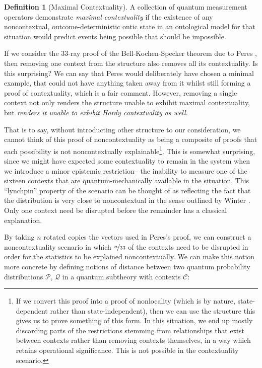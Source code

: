 \documentclass{amsart}
\theoremstyle{definition}
\newtheorem{defn}{Definition}
\begin{document}
\begin{defn}[Maximal Contextuality]
A collection of quantum measurement operators demonstrate \emph{maximal contextuality} if the existence of any noncontextual, outcome-deterministic ontic state in an ontological model for that situation would predict events being possible that should be impossible. %
\end{defn}



If we consider the 33-ray proof of the Bell-Kochen-Specker theorem due to Peres \cite{Pere1991}, then removing one context from the structure also removes all its contextuality. Is this surprising? We can say that Peres would deliberately have chosen a minimal example, that could not have anything taken away from it whilst still forming a proof of contextuality, which is a fair comment. However, removing a single context not only renders the structure unable to exhibit maximal contextuality, but \emph{renders it unable to exhibit Hardy contextuality as well}.

That is to say, without introducting other structure to our consideration, we cannot think of this proof of noncontextuality as being a composite of proofs that each possibility is not noncontextually explainable\footnote{If we convert this proof into a proof of nonlocality (which is by nature, state-dependent rather than state-independent), then we can use the structure this gives us to prove something of this form. In this situation, we end up mostly %
discarding parts of the restrictions stemming from relationships that exist between contexts rather than removing contexts themselves, in a way which retains operational significance. This is not possible in the contextuality scenario.}. This is somewhat surprising, since we might have expected some contextuality to remain in the system when we introduce a minor epistemic restriction-- the inability to measure one of the sixteen contexts that are quantum-mechanically available in the situation. This ``lynchpin'' property of the scenario can be thought of as reflecting the fact that the distribution is very close to noncontextual in the sense outlined by Winter \cite{Wint2014}. Only one context need be disrupted before the remainder has a classical explanation.

By taking $n$ rotated copies the vectors used in Peres's proof, we can construct a noncontextuality scenario in which $\nicefrac{n}{33}$ of the contexts need to be disrupted in order for the statistics to be explained noncontextually. We can make this notion more concrete by defining notions of distance between two quantum probability distributions $\mathcal{P}$, $\mathcal{Q}$ in a quantum subtheory with contexts $\mathcal{C}$:
\end{document}
